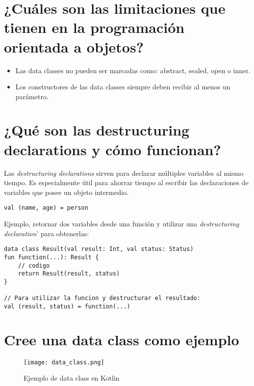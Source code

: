 \documentclass[11pt]{scrartcl} %
\begin{document}
\section{¿Cuáles son las limitaciones que tienen en la programación orientada a objetos?}

\begin{itemize}
	\item Las data classes no pueden ser marcadas como: abstract, sealed, open o inner.
	\item Los constructores de las data classes siempre deben recibir al menos un parámetro.
\end{itemize}

\section{¿Qué son las destructuring declarations y cómo funcionan?}

Las \emph{destructuring declarations} sirven para declarar múltiples variables al mismo tiempo. Es especialmente útil para ahorrar tiempo al escribir las declaraciones de variables que posee un objeto intermedio.

\begin{lstlisting}
val (name, age) = person
\end{lstlisting}

Ejemplo, retornar dos variables desde una función y utilizar una \emph{destructuring declaration}' para obtenerlas:

\begin{lstlisting}
data class Result(val result: Int, val status: Status)
fun function(...): Result {
    // codigo
    return Result(result, status)
}

// Para utilizar la funcion y destructurar el resultado:
val (result, status) = function(...)
\end{lstlisting}

\section{Cree una data class como ejemplo}

\begin{figure}[h] %
	\centering
	\texttt{[image: data\_class.png]} %
	\caption{Ejemplo de data class en Kotlin}
\end{figure}
\end{document}
